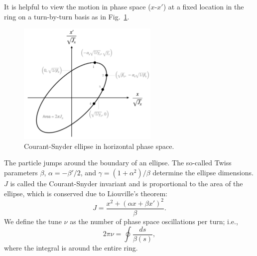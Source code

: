 It is helpful to view the motion in phase space ($x$-$x'$) at a fixed location in the ring on a turn-by-turn basis as in Fig.~\ref{fig:cs_ellipse}.
%
\begin{figure}
    \centering
    \includegraphics[width=0.6\textwidth]{Images/chapter1/cs_ellipse.png}
    \caption{Courant-Snyder ellipse in horizontal phase space.}
    \label{fig:cs_ellipse}
\end{figure}
%
The particle jumps around the boundary of an ellipse. The so-called Twiss parameters $\beta$, $\alpha = -\beta' / 2$, and $\gamma = (1 + \alpha^2) / \beta$ determine the ellipse dimensions. $J$ is called the Courant-Snyder invariant and is proportional to the area of the ellipse, which is conserved due to Liouville's theorem:
%
\begin{equation}\label{eq:CS invariant}
    J = \frac{x^2 + (\alpha x + \beta x')^2}{\beta}.
\end{equation}
%
We define the tune $\nu$ as the number of phase space oscillations per turn; i.e.,
%
\begin{equation}
    2\pi\nu = \oint{\frac{ds}{\beta(s)}},
\end{equation}
%
where the integral is around the entire ring.

